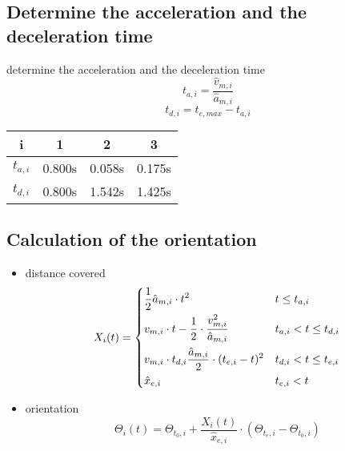 \documentclass[%
  professionalfonts,%
  xcolor={%
    usenames,%
    dvipsnames,%
    svgnames,%
    table,%
    hyperref%
  }%
]{beamer}
\begin{document}
\subsection{Determine the acceleration and the deceleration time}
\begin{frame}
determine the acceleration and the deceleration time
\begin{equation*}
t_{a,i} = \frac{\hat{v}_{m,i}}{\hat{a}_{m,i}}
\end{equation*}
\begin{equation*}
t_{d,i} = t_{e,max} - t_{a,i}
\end{equation*}    

\begin{center}
\begin{tabular}{cccc}
\toprule
i & 1 & 2 & 3 \\
\midrule
$t_{a,i}$ & 0.800s & 0.058s & 0.175s \\ 
$t_{d,i}$ & 0.800s & 1.542s & 1.425s \\
\bottomrule
\end{tabular}
\end{center}
\end{frame}

\subsection{Calculation of the orientation}
\begin{frame}
\begin{itemize}
\item distance covered
\begin{equation*}
X_{i}(t) = 
\begin{dcases}
\frac{1}{2} \hat{a}_{m,i} \cdot t^2  & t \leq t_{a,i} \\
v_{m,i} \cdot t - \frac{1}{2} \cdot \frac{v_{m,i}^2}{\hat{a}_{m,i}} & t_{a,i} < t \leq t_{d,i} \\
v_{m,i} \cdot t_{d,i} \frac{\hat{a}_{m,i}}{2} \cdot (t_{e,i} - t)^2 & t_{d,i} < t \leq t_{e,i}\\
\hat{x}_{e,i} & t_{e,i} < t\\
\end{dcases}
\end{equation*}
\item orientation
\begin{equation*}
\Theta_{i}(t) = \Theta_{t_0,i} + \frac{X_{i}(t)}{\hat{x}_{e,i}} \cdot (\Theta_{t_e,i} - \Theta_{t_0,i} )
\end{equation*}
\end{itemize}
\end{frame}
\end{document}
